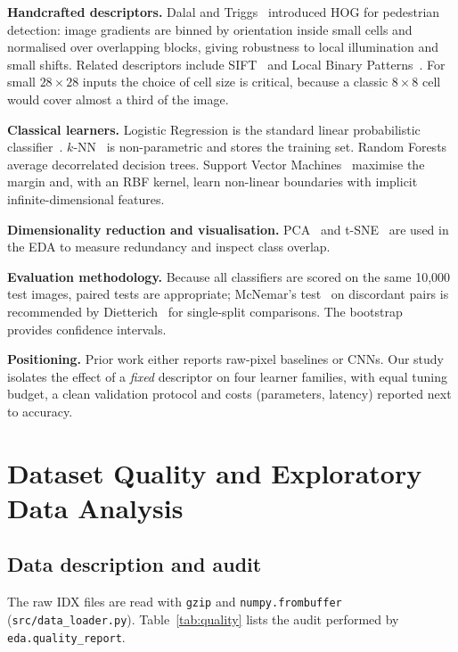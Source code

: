 \documentclass[conference]{IEEEtran}
\begin{document}
\textbf{Handcrafted descriptors.} Dalal and Triggs~\cite{dalal2005} introduced HOG for pedestrian detection: image gradients are binned by orientation inside small cells and normalised over overlapping blocks, giving robustness to local illumination and small shifts. Related descriptors include SIFT~\cite{lowe2004} and Local Binary Patterns~\cite{ojala2002}. For small $28\times28$ inputs the choice of cell size is critical, because a classic $8\times8$ cell would cover almost a third of the image.

\textbf{Classical learners.} Logistic Regression is the standard linear probabilistic classifier~\cite{hastie2009}. $k$-NN~\cite{cover1967} is non-parametric and stores the training set. Random Forests~\cite{breiman2001} average decorrelated decision trees. Support Vector Machines~\cite{cortes1995} maximise the margin and, with an RBF kernel, learn non-linear boundaries with implicit infinite-dimensional features.

\textbf{Dimensionality reduction and visualisation.} PCA~\cite{jolliffe2002} and t-SNE~\cite{vandermaaten2008} are used in the EDA to measure redundancy and inspect class overlap.

\textbf{Evaluation methodology.} Because all classifiers are scored on the same 10{,}000 test images, paired tests are appropriate; McNemar's test~\cite{mcnemar1947} on discordant pairs is recommended by Dietterich~\cite{dietterich1998} for single-split comparisons. The bootstrap~\cite{efron1979} provides confidence intervals.

\textbf{Positioning.} Prior work either reports raw-pixel baselines or CNNs. Our study isolates the effect of a \emph{fixed} descriptor on four learner families, with equal tuning budget, a clean validation protocol and costs (parameters, latency) reported next to accuracy.

\section{Dataset Quality and Exploratory Data Analysis}\label{sec:eda}
\subsection{Data description and audit}
The raw IDX files are read with \texttt{gzip} and \texttt{numpy.frombuffer} (\texttt{src/data\_loader.py}). Table~\ref{tab:quality} lists the audit performed by \texttt{eda.quality\_report}.
\end{document}
